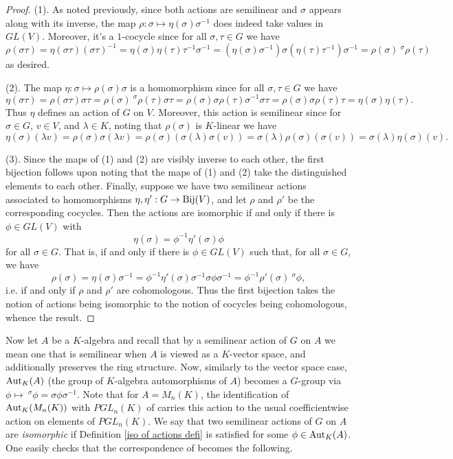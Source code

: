\documentclass[11pt]{amsart}
\numberwithin{equation}{section}
\theoremstyle{remark}
\theoremstyle{remark}
\theoremstyle{remark}
\theoremstyle{definition}
\theoremstyle{definition}
\theoremstyle{definition}
\theoremstyle{definition}
\theoremstyle{definition}
\theoremstyle{definition}
\begin{document}
\begin{proof}
(1). As noted previously, since both actions are semilinear and $\sigma$ appears along with its inverse, the map $\rho:\sigma \mapsto \eta(\sigma)\sigma^{-1}$ does indeed take values in $GL(V)$. Moreover, it's a $1$-cocycle since for all $\sigma,\tau \in G$ we have
\[\rho(\sigma \tau)=\eta(\sigma\tau)(\sigma\tau)^{-1}=\eta(\sigma)\eta(\tau)\tau^{-1}\sigma^{-1}=(\eta(\sigma)\sigma^{-1})\sigma(\eta(\tau)\tau^{-1})\sigma^{-1} =\rho(\sigma)~^\sigma \rho(\tau)\]
as desired. 

(2). The map $\eta:\sigma \mapsto \rho(\sigma)\sigma$ is a homomorphism since for all $\sigma, \tau \in G$ we have
\[\eta(\sigma \tau)=\rho(\sigma \tau)\sigma \tau=\rho(\sigma)~^\sigma \rho(\tau) \sigma \tau= \rho(\sigma) \sigma \rho(\tau) \sigma^{-1} \sigma \tau=\rho(\sigma) \sigma \rho(\tau) \tau=\eta(\sigma)\eta(\tau).\]
Thus $\eta$ defines an action of $G$ on $V$. Moreover, this action is semilinear since for $\sigma\in G$, $v\in V$, and $\lambda \in K$, noting that $\rho(\sigma)$ is $K$-linear we have
\[\eta(\sigma)(\lambda v)=\rho(\sigma)\sigma(\lambda v) =\rho(\sigma)(\sigma(\lambda)\sigma(v))=\sigma(\lambda)\rho(\sigma)(\sigma(v))=\sigma(\lambda)\eta(\sigma)(v).\]

(3). Since the maps of (1) and (2) are visibly inverse to each other, the first bijection follows upon noting that the maps of (1) and (2) take the distinguished elements to each other. Finally, suppose we have two semilinear actions associated to homomorphisms $\eta,\eta':G\rightarrow \textup{Bij}(V)$, and let $\rho$ and $\rho'$ be the corresponding cocycles. Then the actions are isomorphic if and only if there is $\phi \in GL(V)$ with 
\[\eta(\sigma)=\phi^{-1}\eta'(\sigma)\phi\]
for all $\sigma \in G$. That is, if and only if there is $\phi\in GL(V)$ such that, for all $\sigma \in G$, we have
\[\rho(\sigma)=\eta(\sigma)\sigma^{-1}=\phi^{-1}\eta'(\sigma)\sigma^{-1} \sigma \phi \sigma^{-1}=\phi^{-1}\rho'(\sigma)~^\sigma \phi,\]
i.e. if and only if $\rho$ and $\rho'$ are cohomologous. Thus the first bijection takes the notion of actions being isomorphic to the notion of cocycles being cohomologous, whence the result. 
\end{proof}

Now let $A$ be a $K$-algebra and recall that by a semilinear action of $G$ on $A$ we mean one that is semilinear when $A$ is viewed as a $K$-vector space, and additionally preserves the ring structure. Now, similarly to the vector space case, $\textup{Aut}_{K}(A)$ (the group of $K$-algebra automorphisms of $A$) becomes a $G$-group via $\phi \mapsto ~^\sigma \phi=\sigma \phi \sigma^{-1}$. Note that for $A=M_n(K)$, the identification of $\textup{Aut}_{K}(M_n(K))$ with $PGL_n(K)$ of  carries this action to the usual coefficientwise action on elements of $PGL_n(K)$. We say that two semilinear actions of $G$ on $A$ are \textit{isomorphic} if Definition \ref{iso of actions defi} is satisfied for some $\phi \in \textup{Aut}_K(A)$. One easily checks that the correspondence of  becomes the following.
\end{document}
